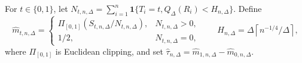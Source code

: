 For \(t\in\{0,1\}\), let \(N_{t,n,\Delta}=\sum_{i=1}^n\mathbf 1\{T_i=t,Q_\Delta(R_i)<H_{n,\Delta}\}\).  Define
\[
 \widehat m_{t,n,\Delta}=
 \begin{cases}
 \Pi_{[0,1]}\!\left(S_{t,n,\Delta}/N_{t,n,\Delta}\right),&N_{t,n,\Delta}>0,\\
 1/2,&N_{t,n,\Delta}=0,
 \end{cases}
 \qquad
 H_{n,\Delta}=\Delta\left\lceil n^{-1/4}/\Delta\right\rceil,
\]
where \(\Pi_{[0,1]}\) is Euclidean clipping, and set \(\widehat\tau_{n,\Delta}=\widehat m_{1,n,\Delta}-\widehat m_{0,n,\Delta}\).